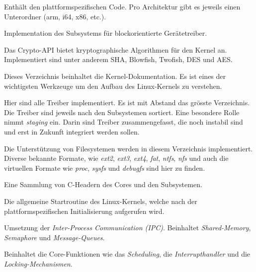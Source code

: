 \begin{minipage}{0.76\textwidth}
\begin{description}[leftmargin=3cm]
   \item[arch]
      Enthält den plattformspezifischen Code.
      Pro Architektur gibt es jeweils einen Unterordner (arm, i64, x86, etc.).

   \item[block]
      Implementation des Subsystems für blockorientierte Gerätetreiber.

   \item[crypto]
      Das Crypto-API bietet kryptographische Algorithmen für den Kernel an.
      Implementiert sind unter anderem SHA, Blowfish, Twofish, DES und AES. 

   \item[Documenation]
      Dieses Verzeichnis beinhaltet die Kernel-Dokumentation. Es ist eines der wichtigsten
      Werkzeuge um den Aufbau des Linux-Kernels zu verstehen.

   \item[drivers]
      Hier sind alle Treiber implementiert. Es ist mit Abstand das grösste Verzeichnis. Die Treiber
      sind jeweils nach den Subsystemen sortiert. Eine besondere Rolle nimmt \emph{staging} ein. Darin
      sind Treiber zusammengefasst, die noch instabil sind und erst in Zukunft integriert werden sollen. 

   \item[fs]
      Die Unterstützung von Filesystemen werden in diesem Verzeichnis implementiert. Diverse bekannte Formate, wie
      \emph{ext2}, \emph{ext3}, \emph{ext4}, \emph{fat}, \emph{ntfs},
      \emph{nfs} und auch die virtuellen Formate wie \emph{proc}, \emph{sysfs} und \emph{debugfs} sind
      hier zu finden.
      
   \item[include]
      Eine Sammlung von C-Headern des Cores und den Subsystemen.

   \item[init]
      Die allgemeine Startroutine des Linux-Kernels, welche nach der plattformspezifischen Initialisierung aufgerufen wird.

   \item[ipc]
      Umsetzung der \emph{Inter-Process Communication (IPC)}. Beinhaltet \emph{Shared-Memory},
      \emph{Semaphore} und \emph{Message-Queues}.

   \item[kernel]
      Beinhaltet die Core-Funktionen wie das \emph{Scheduling}, die \emph{Interrupthandler} und die \emph{Locking-Mechanismen}.
\end{description}
\end{minipage}
